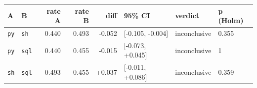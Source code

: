 \begin{tabular}{llrrrlll}
\toprule
A & B & rate A & rate B & diff & 95\% CI & verdict & p (Holm) \\
\midrule
\texttt{py} & \texttt{sh} & 0.440 & 0.493 & -0.052 & [-0.105, -0.004] & inconclusive & 0.355 \\
\texttt{py} & \texttt{sql} & 0.440 & 0.455 & -0.015 & [-0.073, +0.045] & inconclusive & 1 \\
\texttt{sh} & \texttt{sql} & 0.493 & 0.455 & +0.037 & [-0.011, +0.086] & inconclusive & 0.359 \\
\bottomrule
\end{tabular}
